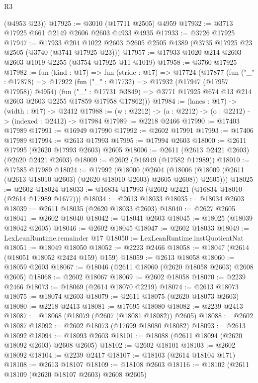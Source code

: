 \begin{lexlean}{R3}
\begin{coremodule}
      (@4953 @23))
@17925 := @3010 (@17711 @2505) @4959
@17932 := @3713 @17925 @661 @2149 @2606 @2603 @4933 @4935
@17933 := @3726 @17925
@17947 := @17933
    @204
    @1022
    @2603
    @2605
    @2505
    @4389
    (@3735 @17925 @23 @2505 (@3740 (@3741 @17925 @23)))
@17957 := @17933 @1020 @214 @2603 @2603 @1019 @2255 (@3754 @17925 @11 @1019)
@17958 := @3760 @17925
@17982 := fun (kind : @17) =>
  fun (stride : @17) =>
  @17724
    (@17877
      (fun ("_" : @17878) =>
      @17922
        (fun ("_" : @17732) => @17932 (@17947 (@17957 @17958)) @4954)
        (fun ("_" : @17731 @3849) =>
        @3771 @17925 @674 @13 @214 @2603 @2603 @2255 @17859 @17958 @17862)))
@17984 := (lanes : @17) -> (width : @17) -> @2412
@17988 := (w : @2212) -> (a : @2212) -> (o : @2212) -> (indexed : @2412) -> @17984
@17989 := @2218 @2466
@17990 := @17403 @17989
@17991 := @16949 @17990
@17992 := @2602 @17991
@17993 := @17406 @17989
@17994 := @2613 @17993
@17995 := @17994 @2603
@18000 := @2611 @17995 (@2620 @17993 @2603) @2605
@18006 := @2611 (@2613 @2421 @2603) (@2620 @2421 @2603)
@18009 := @2602 (@16949 (@17582 @17989))
@18010 := @17585 @17989
@18024 := @17992
    (@18000
      (@2604 (@18006 (@18009 (@2611 (@2613 @18010 @2603) (@2620 @18010 @2603) @2605 @2608)) @2605)))
@18025 := @2602 @18024
@18033 := @16834 @17993 (@2602 @2421 (@16834 @18010 (@2614 @17989 @1677)))
@18034 := @2613 @18033
@18035 := @18034 @2603
@18039 := @2611 @18035 (@2620 @18033 @2603)
@18040 := @2627 @2605
@18041 := @2602 @18040
@18042 := @18041 @2603
@18045 := @18025 (@18039 @18042 @2605)
@18046 := @2602 @18045
@18047 := @2602 @18033
@18049 := LexLeanRuntime.remainder @17
@18050 := LexLeanRuntime.instQuotientNat
@18051 := @18049 @18050
@18052 := @2223 @2466
@18058 := @18047 (@2614 (@18051 @18052 @2424 @159) @159)
@18059 := @2613 @18058
@18060 := @18059 @2603
@18067 := @18046 (@2611 @18060 (@2620 @18058 @2603) @2608 @2605)
@18068 := @2602 @18067
@18069 := @2602 @18058
@18070 := @2239 @2466
@18073 := @18069 (@2614 @18070 @2219)
@18074 := @2613 @18073
@18075 := @18074 @2603
@18079 := @2611 @18075 (@2620 @18073 @2603)
@18080 := @2218 @2413
@18081 := @17695 @18080
@18082 := @2239 @2413
@18087 := @18068 (@18079 (@2607 (@18081 @18082)) @2605)
@18088 := @2602 @18087
@18092 := @2602 @18073 (@17699 @18080 @18082)
@18093 := @2613 @18092
@18094 := @18093 @2603
@18101 := @18088 (@2611 @18094 (@2620 @18092 @2603) @2608 @2605)
@18102 := @2602 @18101
@18103 := @2602 @18092
@18104 := @2239 @2417
@18107 := @18103 (@2614 @18104 @171)
@18108 := @2613 @18107
@18109 := @18108 @2603
@18116 := @18102 (@2611 @18109 (@2620 @18107 @2603) @2608 @2605)

\end{coremodule}
\end{lexlean}
